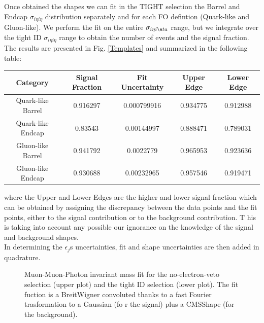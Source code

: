 Once obtained the shapes we can fit in the TIGHT selection the Barrel and Endcap $\sigma_{i \eta i \eta}$ distribution separately and for each FO defintion (Quark-like and Gluon-like). We perform the fit on the entire $\sigma_{i 
\eta i \e
ta}$ range, but we integrate over the tight ID $\sigma_{i \eta i \eta}$ range to obtain the number of events and the signal fraction. \\

The results are presented in Fig. \ref{Templates} and summarized in the following table:

\begin{tabular}{c c c c c}
Category    & Signal Fraction & Fit Uncertainty & Upper Edge & Lower Edge \\
\hline
Quark-like Barrel & 0.916297 & 0.000799916 & 0.934775 & 0.912988  \\
Quark-like Endcap & 0.83543  & 0.00144997  & 0.888471 & 0.789031  \\
Gluon-like Barrel & 0.941792 & 0.0022779   & 0.965953 & 0.923636  \\
Gluon-like Endcap & 0.930688 & 0.00232965  & 0.957546 & 0.919471  \\
\end{tabular}

where the Upper and Lower Edges are the higher and lower signal fraction which can be obtained by assigning the discrepancy between the data points and the fit points, either to the signal contribution or to the background 
contribution. T
his is taking into account any possible our ignorance on the knowledge of the signal and background shapes. \\

In determining the $\epsilon_{j}$s uncertainties, fit and shape uncertainties are then added in quadrature.


\begin{figure}[!ht]
  \begin{center}
  \end{center}
    \caption{Muon-Muon-Photon invariant mass fit for the no-electron-veto selection (upper plot) and the tight ID selection (lower plot). The fit fuction is a BreitWigner convoluted thanks to a fast Fourier trasformation to a 
Gaussian (fo
r the signal) plus a CMSShape (for the background).}
    \label{Zmass_signal}
\end{figure}

